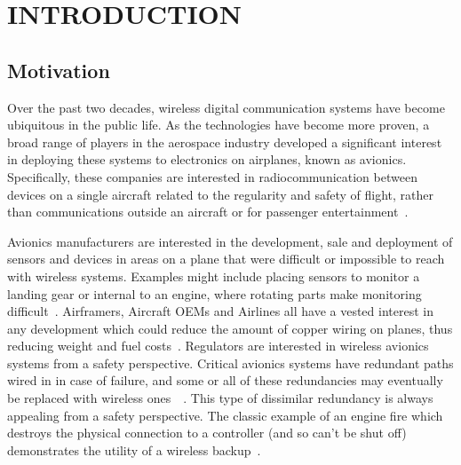 %
%
%
%



\pagestyle{plain} %
\setcounter{page}{1}


\chapter{\uppercase {Introduction}}


\section{Motivation}

Over the past two decades, wireless digital communication systems have become ubiquitous in the public life. As the technologies have become more proven, a broad range of players in the aerospace industry developed a significant interest in deploying these systems to electronics on airplanes, known as avionics. Specifically, these companies are interested in radiocommunication between devices on a single aircraft related to the regularity and safety of flight, rather than communications outside an aircraft or for passenger entertainment~\cite{redman_waic_2011}. 

Avionics manufacturers are interested in the development, sale and deployment of sensors and devices in areas on a plane that were difficult or impossible to reach with wireless systems.  Examples might include placing sensors to monitor a landing gear or internal to an engine, where rotating parts make monitoring difficult~\cite{redman_waic_2011}. Airframers, Aircraft OEMs and Airlines all have a vested interest in any development which could reduce the amount of copper wiring on planes, thus reducing weight and fuel costs~\cite{canaday_war_2017}. Regulators are interested in wireless avionics systems from a safety perspective. Critical avionics systems have redundant paths wired in in case of failure, and some or all of these redundancies may eventually be replaced  with wireless ones~\cite{canaday_war_2017}~\cite{redman_waic_2011}. This type of dissimilar redundancy is always appealing from a safety perspective. The classic example of an engine fire which destroys the physical connection to a controller (and so can't be shut off) demonstrates the utility of a wireless backup~\cite{redman_waic_2011}.

